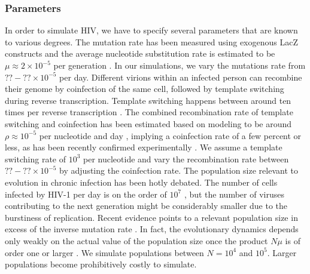 \documentclass[11pt]{article}
\begin{document}
\subsubsection*{Parameters}
In order to simulate HIV, we have to specify several parameters that are
known to various degrees. The mutation rate has been measured using
exogenous LacZ constructs and the average nucleotide substitution rate is 
estimated to be $\mu\approx 2 \times 10^{-5}$ per generation \citep{mansky_lower_1995,
abram_nature_2010}. In our simulations, we vary the mutations rate
from $?? -?? \times 10^{-5}$ per day. Different virions within an
infected person can recombine their genome by coinfection of the same
cell, followed by template switching during reverse transcription. 
Template switching happens between around ten times per reverse
transcription \citep{levy_dynamics_2004}. The combined recombination rate of template
switching and coinfection has been estimated based on modeling to be around $\rho\approx
10^{-5}$ per nucleotide and day
\citep{neher_recombination_2010,batorsky_estimate_2011}, implying a
coinfection rate of a few percent or less, as has been recently
confirmed experimentally \citep{josefsson_single_2013}. We assume a
template switching rate of $10^{3}$ per nucleotide and vary the
recombination rate between $??-??\times 10^{-5}$ by adjusting the
coinfection rate. The population size relevant to evolution in chronic
infection has been hotly debated. The number of cells infected by HIV-1
per day is on the order of $10^{7}$ \citep{perelson_hiv-1_1996}, but the
number of viruses contributing to the next generation might be
considerably smaller due to the burstiness of replication. 
Recent evidence points to a relevant population
size in excess of the inverse mutation rate
\citep{boltz_ultrasensitive_2012}. In fact, the evolutionary dynamics
depends only weakly on the actual value of the population size once the
product $N\mu$ is of order one or larger \citep{neher_genetic_2011}. We
simulate populations between $N=10^4$ and $10^5$. Larger populations
become prohibitively costly to simulate.
\end{document}

